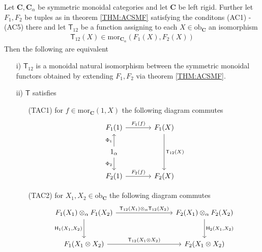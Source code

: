 \begin{thm}
\label{THM:ACMNT}
Let $\mathbf{C}, \mathbf{C}_{\alpha}$ be symmetric monoidal categories and let $\mathbf{C}$ be left rigid. Further let $F_{1},F_{2}$ be tuples as in theorem \ref{THM:ACSMF} satisfying the conditons (AC1) - (AC5) there and let $\mathsf{T}_{12}$ be a function assigning to each $X \in \mathrm{ob}_{\mathbf{C}}$ an isomorphism
\begin{align*}
  \mathsf{T}_{12}(X)
  \in
  \mathrm{mor}_{\mathbf{C}_{\alpha}}(F_{1}(X),F_{2}(X))
\end{align*}
Then the following are equivalent
\begin{enumerate}
\item[i)]
$\mathsf{T}_{12}$ is a monoidal natural isomorphism between the symmetric monoidal functors obtained by extending $F_{1},F_{2}$ via theorem \ref{THM:ACSMF}.

\item[ii)]
$\mathsf{T}$ satisfies
\begin{enumerate}
\item[(TAC1)]
for $f \in \mathrm{mor}_{\mathbf{C}}(1,X)$ the following diagram commutes
\begin{equation*}
\begin{tikzcd}[column sep=large]
  F_{1}(1)
  \ar{r}{F_{1}(f)}
  &
  F_{1}(X)
  \ar{dd}{\mathsf{T}_{12}(X)}
  \\
  1_{\alpha}
  \ar{u}{\Phi_{1}}
  \ar{d}[swap]{\Phi_{2}}
  \\
  F_{2}(1)
  \ar{r}{F_{2}(f)}
  &
  F_{2}(X)
\end{tikzcd}
\end{equation*}

\item[(TAC2)]
for $X_{1},X_{2} \in \mathrm{ob}_{\mathbf{C}}$ the following diagram commutes
\begin{equation*}
\begin{tikzcd}[row sep=large,column sep=8em]
  F_{1}(X_{1})
  \otimes_{\alpha}
  F_{1}(X_{2})
  \arrow{r}{\mathsf{T}_{12}(X_{1}) \otimes_{\alpha} \mathsf{T}_{12}(X_{2})}
  \arrow[swap]{d}{\mathsf{H}_{1}(X_{1},X_{2})}
  &
  F_{2}(X_{1})
  \otimes_{\alpha}
  F_{2}(X_{2})
  \arrow{d}{\mathsf{H}_{2}(X_{1},X_{2})}
  \\
  F_{1}(X_{1} \otimes X_{2})
  \arrow{r}{\mathsf{T}_{12}(X_{1} \otimes X_{2})}
  &
  F_{2}(X_{1} \otimes X_{2})
\end{tikzcd}
\end{equation*}
\end{enumerate}
\end{enumerate}
\end{thm}

